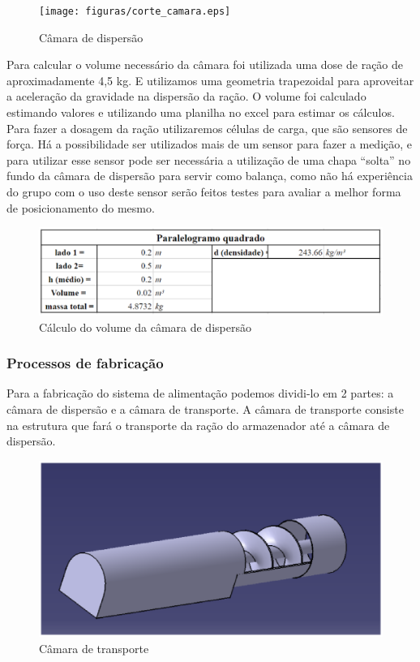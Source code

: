 \begin{figure}[H]
 \centering
   \texttt{[image: figuras/corte\_camara.eps]}
 \caption{Câmara de dispersão}
 \label{corte_camara}
\end{figure}

Para calcular o volume necessário da câmara foi utilizada uma dose de ração de aproximadamente 4,5 kg. E utilizamos uma geometria trapezoidal para aproveitar a aceleração da gravidade na dispersão da ração. O volume foi calculado estimando valores e utilizando uma planilha no excel para estimar os cálculos. Para fazer a dosagem da ração utilizaremos células de carga, que são sensores de força. Há a possibilidade ser utilizados mais de um sensor para fazer a medição, e para utilizar esse sensor pode ser necessária a utilização de uma chapa “solta” no fundo da câmara de dispersão para servir como balança, como não há experiência do grupo com o uso deste sensor serão feitos testes para avaliar a melhor forma de posicionamento do mesmo.

\begin{figure}[H]
 \centering
   \includegraphics[keepaspectratio=true,scale=0.8]{figuras/quadro_parelolo.eps}
 \caption{Cálculo do volume da câmara de dispersão}
 \label{quadro_parelolo}
\end{figure}

\subsubsection{Processos de fabricação}

Para a fabricação do sistema de alimentação podemos dividi-lo em 2 partes: a câmara de dispersão e a câmara de transporte. A câmara de transporte consiste na estrutura que fará o transporte da ração do armazenador até a câmara de dispersão.

\begin{figure}[H]
 \centering
   \includegraphics[keepaspectratio=true,scale=0.8]{figuras/camara_transporte.eps}
 \caption{Câmara de transporte}
 \label{camara_transporte}
\end{figure}

